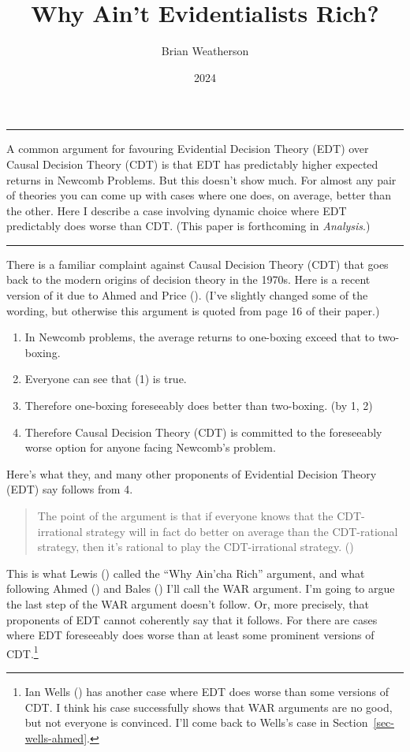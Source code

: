 \documentclass[
  10pt,
  letterpaper,
  DIV=11,
  numbers=noendperiod,
  twoside]{scrartcl}
\title{Why Ain't Evidentialists Rich?}
\author{Brian Weatherson}
\date{2024}
\providecommand{\tightlist}{%
  \setlength{\itemsep}{0pt}\setlength{\parskip}{0pt}}\usepackage{longtable,booktabs,array}
\renewenvironment{abstract}
 {\vspace{-1.25cm}
 \quotation\small\noindent\rule{\linewidth}{.5pt}\par\smallskip
 \noindent }
 {\par\noindent\rule{\linewidth}{.5pt}\endquotation}
\begin{document}
\maketitle
\begin{abstract}
A common argument for favouring Evidential Decision Theory (EDT) over
Causal Decision Theory (CDT) is that EDT has predictably higher expected
returns in Newcomb Problems. But this doesn't show much. For almost any
pair of theories you can come up with cases where one does, on average,
better than the other. Here I describe a case involving dynamic choice
where EDT predictably does worse than CDT. (This paper is forthcoming in
\emph{Analysis}.)
\end{abstract}


There is a familiar complaint against Causal Decision Theory (CDT) that
goes back to the modern origins of decision theory in the 1970s. Here is
a recent version of it due to Ahmed and Price
(). (I've slightly changed some of
the wording, but otherwise this argument is quoted from page 16 of their
paper.)

\begin{enumerate}
\def\labelenumi{\arabic{enumi}.}
\tightlist
\item
  In Newcomb problems, the average returns to one-boxing exceed that to
  two-boxing.
\item
  Everyone can see that (1) is true.
\item
  Therefore one-boxing foreseeably does better than two-boxing. (by 1,
  2)
\item
  Therefore Causal Decision Theory (CDT) is committed to the foreseeably
  worse option for anyone facing Newcomb's problem.
\end{enumerate}

Here's what they, and many other proponents of Evidential Decision
Theory (EDT) say follows from 4.

\begin{quote}
The point of the argument is that if everyone knows that the
CDT-irrational strategy will in fact do better on average than the
CDT-rational strategy, then it's rational to play the CDT-irrational
strategy. ()
\end{quote}

This is what Lewis () called the ``Why
Ain'cha Rich'' argument, and what following Ahmed
() and Bales
() I'll call the WAR argument. I'm going
to argue the last step of the WAR argument doesn't follow. Or, more
precisely, that proponents of EDT cannot coherently say that it follows.
For there are cases where EDT foreseeably does worse than at least some
prominent versions of CDT.\footnote{Ian Wells
  () has another case where EDT does worse
  than some versions of CDT. I think his case successfully shows that
  WAR arguments are no good, but not everyone is convinced. I'll come
  back to Wells's case in Section~\ref{sec-wells-ahmed}.}
\end{document}
